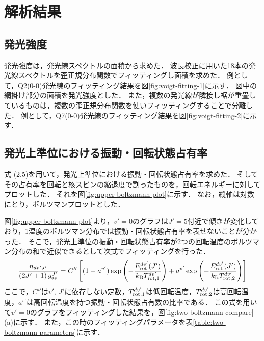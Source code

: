 \chapter{解析結果}

\section{発光強度}
発光強度は，発光線スペクトルの面積から求めた．
波長校正に用いた18本の発光線スペクトルを歪正規分布関数でフィッティングし面積を求めた．
例として，Q2(0-0)発光線のフィッティング結果を図\ref{fig:voigt-fitting-1}に示す．
図中の網掛け部分の面積を発光強度とした．
また，複数の発光線が隣接し裾が重畳しているものは，複数の歪正規分布関数を使いフィッティングすることで分離した．
例として，Q7(0-0)発光線のフィッティング結果を図\ref{fig:voigt-fitting-2}に示す．

\section{発光上準位における振動・回転状態占有率}
式 (2.5)を用いて，発光上準位における振動・回転状態占有率を求めた．
そしてその占有率を回転と核スピンの縮退度で割ったものを，回転エネルギーに対してプロットした．
それを図\ref{fig:upper-boltzmann-plot}に示す．
なお，縦軸は対数にとり，ボルツマンプロットとした．

図\ref{fig:upper-boltzmann-plot}より，$v'=0$のグラフは$J'=5$付近で傾きが変化しており，1温度のボルツマン分布では振動・回転状態占有率を表せないことが分かった．
そこで，発光上準位の振動・回転状態占有率が2つの回転温度のボルツマン分布の和で近似できるとして次式でフィッティングを行った．
\begin{equation}
    \frac{n_{dv'J'}}{\left( 2J'+1 \right)g^{J'}_{\rm as}} = C'' \left[ (1-a^{v'})\exp \left( - \frac{E^{dv'}_{\rm rot}(J')}{k_{\rm B} T^{dv'}_{\rm rot,1}} \right)+ a^{v'} \exp \left( - \frac{E^{dv'}_{\rm rot}(J')}{k_{\rm B} T^{dv'}_{\rm rot,2}} \right) \right]
\end{equation}
ここで，$C''$は$v'$, $J'$に依存しない定数，$T^{dv'}_{\rm rot,1}$は低回転温度，$T^{dv'}_{\rm rot,2}$は高回転温度，$a^{v'}$は高回転温度を持つ振動・回転状態占有数の比率である．
この式を用いて$v'=0$のグラフをフィッティングした結果を，図\ref{fig:two-boltzmann-compare}(a)に示す．
また，この時のフィッティングパラメータを表\ref{table:two-boltzmann-parameters}に示す．

